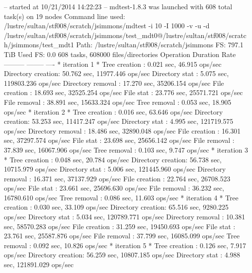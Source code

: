 \documentclass[conference,compsoc]{IEEEtran}
\begin{document}
-- started at 10/21/2014 14:22:23 --
mdtest-1.8.3 was launched with 608 total task(s) on 19 nodes
Command line used: /lustre/sultan/stf008/scratch/jsimmons/mdtest -i 10 -I 1000 -v -u -d /lustre/sultan/stf008/scratch/jsimmons/test_mdt0@/lustre/sultan/stf008/scratch/jsimmons/test_mdt1
Path: /lustre/sultan/stf008/scratch/jsimmons
FS: 797.1 TiB   Used FS: 0.0%
608 tasks, 608000 files/directories
Operation               Duration              Rate
   ---------               --------              ----
 * iteration 1 *
   Tree creation     :      0.021 sec,     46.915 ops/sec
   Directory creation:     50.762 sec,  11977.446 ops/sec
   Directory stat    :      5.075 sec, 119803.236 ops/sec
   Directory removal :     17.270 sec,  35206.154 ops/sec
   File creation     :     18.693 sec,  32525.254 ops/sec
   File stat         :     23.776 sec,  25571.721 ops/sec
   File removal      :     38.891 sec,  15633.324 ops/sec
   Tree removal      :      0.053 sec,     18.905 ops/sec
 * iteration 2 *
   Tree creation     :      0.016 sec,     63.646 ops/sec
   Directory creation:     53.253 sec,  11417.247 ops/sec
   Directory stat    :      4.995 sec, 121719.575 ops/sec
   Directory removal :     18.486 sec,  32890.048 ops/sec
   File creation     :     16.301 sec,  37297.574 ops/sec
   File stat         :     23.698 sec,  25656.142 ops/sec
   File removal      :     37.839 sec,  16067.906 ops/sec
   Tree removal      :      0.103 sec,      9.747 ops/sec
 * iteration 3 *
   Tree creation     :      0.048 sec,     20.784 ops/sec
   Directory creation:     56.738 sec,  10715.979 ops/sec
   Directory stat    :      5.006 sec, 121445.960 ops/sec
   Directory removal :     16.371 sec,  37137.929 ops/sec
   File creation     :     22.764 sec,  26708.523 ops/sec
   File stat         :     23.661 sec,  25696.630 ops/sec
   File removal      :     36.232 sec,  16780.610 ops/sec
   Tree removal      :      0.086 sec,     11.603 ops/sec
 * iteration 4 *
   Tree creation     :      0.030 sec,     33.109 ops/sec
   Directory creation:     65.516 sec,   9280.225 ops/sec
   Directory stat    :      5.034 sec, 120789.771 ops/sec
   Directory removal :     10.381 sec,  58570.283 ops/sec
   File creation     :     31.259 sec,  19450.693 ops/sec
   File stat         :     23.761 sec,  25587.876 ops/sec
   File removal      :     37.799 sec,  16085.099 ops/sec
   Tree removal      :      0.092 sec,     10.826 ops/sec
 * iteration 5 *
   Tree creation     :      0.126 sec,      7.917 ops/sec
   Directory creation:     56.259 sec,  10807.185 ops/sec
   Directory stat    :      4.988 sec, 121891.029 ops/sec
\end{document}
